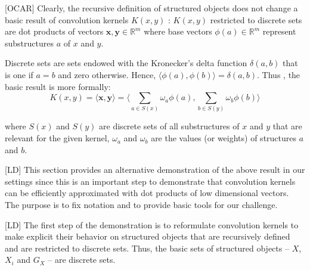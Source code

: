 \documentclass[twoside,11pt]{article}
\def\vec#1{\mathbf{#1}}
\def\R{\mathbb{R}}
\def\dotprod#1#2{\langle#1,#2\rangle}
\def\OBV#1{\phi(#1)}
\def\finalcomment#1#2{}
\def\finalsecondcomment#1#2{}
\def\LD#1{[{\color{blue}L}D] {\color{blue}#1}}
\def\OCAR#1#2#3#4{[{\color{blue}O}{\color{brown}C}{\color{black}A}{\color{purple}R}] {\color{blue}#1} {\color{brown}#2} {\color{black}#3} {\color{purple}#4}}
\begin{document}
\OCAR{Clearly, the recursive definition of structured objects does not change a basic result of convolution kernels $K(x,y)$ \cite{Haussler99convolutionkernels}:}{$K(x,y)$ restricted to discrete sets are dot products of vectors $\vec{x},\vec{y} \in \R^m$ where base vectors $\OBV{a}\in \R^m$ represent substructures $a$ of $x$ and $y$.}{Discrete sets are sets endowed with the Kronecker's delta function $\delta(a,b)$ that 
is one if $a = b$ and zero otherwise. Hence, $\dotprod{\OBV{a}}{\OBV{b}} =\delta(a,b)$. Thus , the basic result is more formally:
\begin{equation}
K(x,y) = \dotprod{\vec{x}}{\vec{y}} 
= \dotprod{\displaystyle\sum_{a\in S(x)} \omega_{a} \OBV{a}}{\displaystyle\sum_{b \in S(y)} \omega_{b} \OBV{b}}
\label{K_as_deltas}
\end{equation}
\finalsecondcomment{R3.4}{"$w_a$ and $w_b$ are the weights of substructures a and b." what is a weight mathematically speaking? if $w_a$ is a weight, what part of a total mass does $w_a$ represent?}
where $S(x)$ and $S(y)$  are discrete sets of all substructures of $x$ and $y$ that are relevant for the given kernel, $\omega_{a}$ and $\omega_{b}$ are the values (or weights) of structures $a$ and $b$.}
%
{}

\LD{This section provides an alternative demonstration of the above result in our settings since this is an important step to demonstrate that convolution kernels can be efficiently approximated with dot products of  low dimensional vectors.} The purpose is to fix notation and to provide basic tools for our challenge.



\LD{The first step of the demonstration is to reformulate convolution kernels to make explicit their behavior on structured objects that are recursively defined and are restricted to discrete sets.} 
Thus, the basic sets of structured objects -- $X$, $X_i$ and $G_X$ -- are discrete sets.
\finalcomment{Equation 1 seems to require that both x and y must be decomposed into the same number of parts. This should be addressed in some way}{R1.1}
\finalcomment{Definition 1 is narrower than Haussler's definition of convolution kernels due to the delta function. It would probably be best to note this fact.}{R1.2}
\finalsecondcomment{R3.2}{Definition 1 is not, as a matter of fact, Haussler's definition for convolution kernels. His definition is far more clear. Please differentiate your definition from Haussler's.}
\end{document}
